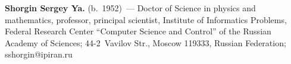 \vspace*{3pt}

\noindent
\textbf{Shorgin Sergey Ya.} (b.\ 1952)~--- 
Doctor of Science in physics and mathematics, professor, principal 
scientist, Institute of Informatics Problems, Federal Research Center ``Computer Science and Control'' of 
the Russian Academy of Sciences; 44-2~Vavilov Str., Moscow 119333, Russian Federation; 
\mbox{sshorgin@ipiran.ru}
\label{end\stat}

\renewcommand{\bibname}{\protect\rm Литература}  